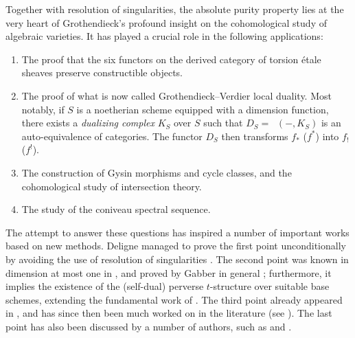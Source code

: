 \documentclass[JEP,XML,SOM,Unicode]{cedram}
\newcommand{\tstructure}{$t$-structure\xspace}
\DeclareMathOperator{\uHom}{\underline{Hom}}
\theoremstyle{remark}
\theoremstyle{definition}
\numberwithin{equation}{thm}
\begin{document}
Together with resolution of singularities, the absolute purity property lies at the very heart of Grothendieck's profound insight on the cohomological study of algebraic varieties. It has played a crucial role in the following applications:
\begin{enumerate}
\item The proof that the six functors on the derived category of torsion étale sheaves preserve constructible objects.

\item The proof of what is now called Grothendieck--Verdier local duality. Most notably, if $S$ is a noetherian scheme equipped with a dimension function, there exists a \emph{dualizing complex} $K_S$ over $S$ such that $D_S=\uHom(-,K_S)$ is an auto-equivalence of categories. The functor $D_S$ then transforms $f_*$ (\resp $f^*$) into $f_!$ (\resp $f^!$).

\item The construction of Gysin morphisms and cycle classes, and the cohomological study of intersection theory.

\item The study of the coniveau spectral sequence.
\end{enumerate}
The attempt to answer these questions has inspired a number of important works based on new methods. Deligne managed to prove the first point unconditionally by avoiding the use of resolution of singularities \cite[Th.\,Finitude]{SGA4.5}. The second point was known in dimension at most one in \cite[Dualité\,1.4]{SGA4.5}, and proved by Gabber in general \cite[XVII]{Gabber}; furthermore, it implies the existence of the (self-dual) perverse \tstructure over suitable base schemes, extending the fundamental work of \cite{BBD}.
The third point already appeared in \cite[XVIII]{SGA4}, and has since then been much worked on in the literature (see \cite{DJK}). The last point has also been discussed by a number of authors, such as \cite{BlochOgus} and \cite{CTHK}.
\end{document}
